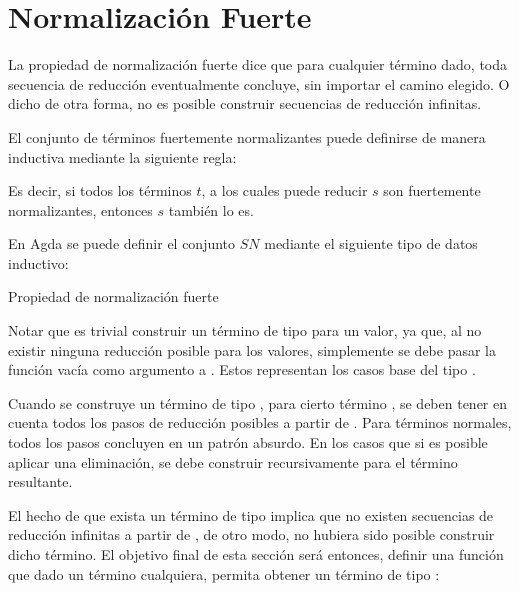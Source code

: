 \section{Normalización Fuerte}

La propiedad de normalización fuerte dice que para cualquier término dado, toda secuencia de reducción eventualmente concluye, sin importar el camino elegido.
O dicho de otra forma, no es posible construir secuencias de reducción infinitas.

El conjunto de términos fuertemente normalizantes puede definirse de manera inductiva mediante la siguiente regla:

\begin{center}
	\begin{prooftree}
	\end{prooftree}
\end{center}

Es decir, si todos los términos $t$, a los cuales puede reducir $s$ son fuertemente normalizantes, entonces $s$ también lo es. 

En Agda se puede definir el conjunto $SN$ mediante el siguiente tipo de datos inductivo: 

\begin{codigo}
	Propiedad de normalización fuerte
\end{codigo}

Notar que es trivial construir un término de tipo  para un valor, ya que, al no existir ninguna reducción posible para los valores, simplemente se debe pasar la función vacía como argumento a .
Estos representan los casos base del tipo .

\begin{example}
	Cuando se construye un término de tipo  , para cierto término , se deben tener en cuenta todos los pasos de reducción posibles a partir de .
	Para términos normales, todos los pasos concluyen en un patrón absurdo.
	En los casos que si es posible aplicar una eliminación, se debe construir recursivamente  para el término resultante.
	
\end{example}

El hecho de que exista un término de tipo   implica que no existen secuencias de reducción infinitas a partir de , de otro modo, no hubiera sido posible construir dicho término.
El objetivo final de esta sección será entonces, definir una función que dado un término cualquiera, permita obtener un término de tipo  :

